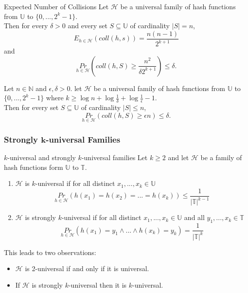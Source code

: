 \documentclass[english]{panikzettel}
\begin{document}
\begin{halfboxl}
\vspace{-\baselineskip}
	\begin{theo}{Expected Number of Collisions}
	Let $\mathcal{H}$ be a universal family of hash functions from $\mathbb{U}$ to $\{0,...,2^k-1 \}$. \\
	Then for every $\delta>0$ and every set $S\subseteq \mathbb{U}$ of cardinality $|S|=n$,
	\[
	E_{h\in\mathcal{H}}(coll(h,s))=\frac{n(n-1)}{2^{k+1}}
	\]
	and
	\[
	\underset{h\in\mathcal{H}}{Pr}\left( coll(h,S) \geq \frac{n^2}{\delta 2^{k+1}} \right)\leq \delta.
	\]
	\end{theo}
\end{halfboxl}
\begin{halfboxr}
\vspace{-\baselineskip}
	\begin{theo}{}
	Let $n\in\mathbb{N}$ and $\epsilon, \delta>0$. let $\mathcal{H}$ be a universal family of hash functions from $\mathbb{U}$ to $\{0,...,2^{k}-1\}$ where $k\geq \log n + \log \frac{1}{\delta}+\log \frac{1}{\epsilon}-1$. \\
	Then for every set $S\subseteq \mathbb{U}$ of cardinality $|S| \leq n$,
	\[
	\underset{h\in\mathcal{H}}{Pr}(coll(h,S)\geq \epsilon n)\leq \delta.
	\]
	\end{theo}
\end{halfboxr}

\subsubsection{Strongly $\mathbf{k}$-universal Families}
\begin{defi}{$k$-universal and strongly $k$-universal families}
Let $k\geq 2$ and let $\mathcal{H}$ be a family of hash functions form $\mathbb{U}$ to $\mathbb{T}$.
\begin{enumerate}
\item $\mathcal{H}$ is $k$-universal if for all distinct $x_1,...,x_k\in\mathbb{U}$
\[
\underset{h\in\mathcal{H}}{Pr}(h(x_1)=h(x_2)=...=h(x_k))\leq \frac{1}{|\mathbb{T}|^{k-1}}
\]
\item $\mathcal{H}$ is strongly $k$-universal if for all distinct $x_1,...,x_k\in\mathbb{U}$ and all $y_1,...,x_k\in\mathbb{T}$
\[
\underset{h\in\mathcal{H}}{Pr}(h(x_1)=y_1\wedge...\wedge h(x_k)=y_k)=\frac{1}{|\mathbb{T}|^k}
\]
\end{enumerate}
\end{defi}
This leads to two observations:
\begin{itemize}
\item $\mathcal{H}$ is 2-universal if and only if it is universal.
\item If $\mathcal{H}$ is strongly $k$-universal then it is $k$-universal.
\end{itemize}
\end{document}
